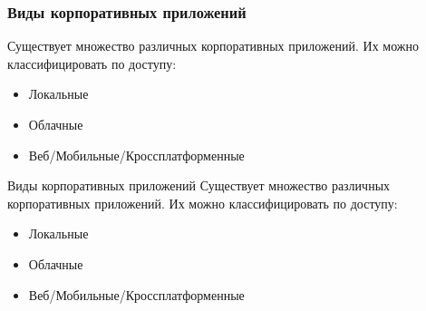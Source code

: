 \documentclass{../industrial-development}
\begin{document}
\begin{frame} \frametitle{Виды корпоративных приложений}
Существует множество различных корпоративных приложений. Их можно классифицировать по доступу: 
\begin{itemize}
		\item Локальные
		\item Облачные
		\item Веб/Мобильные/Кроссплатформенные
\end{itemize}
\end{frame}
\lecturenotes
\alert{Виды корпоративных приложений}
Существует множество различных корпоративных приложений. Их можно классифицировать по доступу: 
\begin{itemize}
		\item Локальные
		\item Облачные
		\item Веб/Мобильные/Кроссплатформенные
\end{itemize}
\end{document}
